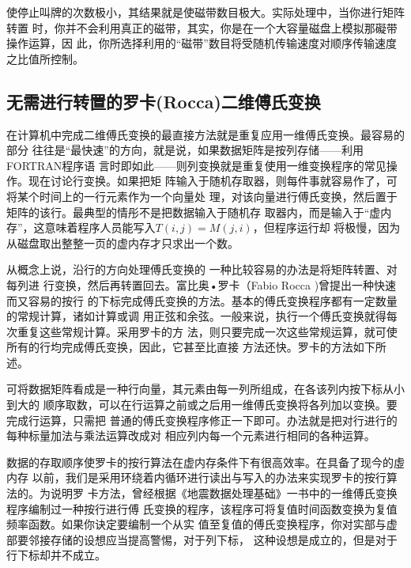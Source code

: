 使停止叫牌的次数极小，其结果就是使磁带数目极大。实际处理中，当你进行矩阵转置
时，你并不会利用真正的磁带，其实，你是在一个大容量磁盘上模拟那礙带操作运算，因
此，你所选择利用的“磁带”数目将受随机传输速度对顺序传输速度之比值所控制。

\subsection{无需进行转置的罗卡(Rocca)二维傅氏变换}
在计算机中完成二维傅氏变换的最直接方法就是重复应用一维傅氏变换。最容易的部分
往往是“最快速”的方向，就是说，如果数据矩阵是按列存储——利用FORTRAN程序语
言时即如此——则列变换就是重复使用一维变换程序的常见操作。现在讨论行变换。如果把矩
阵输入于随机存取器，则每件事就容易作了，可将某个时间上的一行元素作为一个向量处
理，对该向量进行傅氏变换，然后置于矩阵的该行。最典型的情彤不是把数据输入于随机存
取器内，而是输入于“虚内存”，这意味着程序人员能写入$T(i,j)=M(j,i)$，但程序运行却
将极慢，因为从磁盘取出整整一页的虚内存才只求出一个数。

从概念上说，沿行的方向处理傅氏变换的
一种比较容易的办法是将矩阵转置、对每列进
行变换，然后再转置回去。富比奥•罗卡（Fabio Rocca
)曾提出一种快速而又容易的按行
的下标完成傅氏变换的方法。基本的傅氏变换程序都有一定数量的常规计算，诸如计算或调
用正弦和余弦。一般来说，执行一个傅氏变换就得每次重复这些常规计算。采用罗卡的方
法，则只要完成一次这些常规运算，就可使所有的行均完成傅氏变换，因此，它甚至比直接
方法还快。罗卡的方法如下所述。

可将数据矩阵看成是一种行向量，其元素由每一列所组成，在各该列内按下标从小到大的
顺序取数，可以在行运算之前或之后用一维傅氏变换将各列加以变换。要完成行运算，只需把
普通的傅氏变换程序修正一下即可。办法就是把对行进行的每种标量加法与乘法运算改成对
相应列内每一个元素进行相同的各种运算。

数据的存取顺序使罗卡的按行算法在虚内存条件下有很高效率。在具备了现今的虛内存
以前，我们是采用环绕着内循环进行读出与写入的办法来实现罗卡的按行算法的。为说明罗
卡方法，曾经根据《地震数据处理基础》一书中的一维傅氏变换程序编制过一种按行进行傅
氏变换的程序，该程序可将复值时间函数变换为复值频率函数。如果你诀定要编制一个从实
值至复值的傅氏变换程序，你对实部与虚部要邻接存储的设想应当提高警惕，对于列下标，
这种设想是成立的，但是对于行下标却并不成立。



